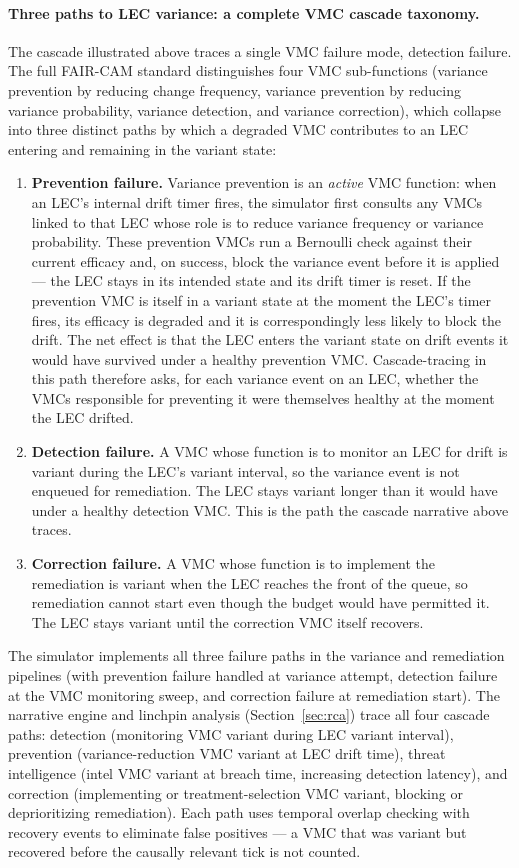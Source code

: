 \documentclass[11pt,a4paper]{article}
\begin{document}
\paragraph{Three paths to LEC variance: a complete VMC cascade taxonomy.}
The cascade illustrated above traces a single VMC failure mode, detection failure. The full FAIR-CAM standard distinguishes four VMC sub-functions (variance prevention by reducing change frequency, variance prevention by reducing variance probability, variance detection, and variance correction), which collapse into three distinct paths by which a degraded VMC contributes to an LEC entering and remaining in the variant state:
\begin{enumerate}[nosep]
    \item \textbf{Prevention failure.} Variance prevention is an \emph{active} VMC function: when an LEC's internal drift timer fires, the simulator first consults any VMCs linked to that LEC whose role is to reduce variance frequency or variance probability. These prevention VMCs run a Bernoulli check against their current efficacy and, on success, block the variance event before it is applied --- the LEC stays in its intended state and its drift timer is reset. If the prevention VMC is itself in a variant state at the moment the LEC's timer fires, its efficacy is degraded and it is correspondingly less likely to block the drift. The net effect is that the LEC enters the variant state on drift events it would have survived under a healthy prevention VMC. Cascade-tracing in this path therefore asks, for each variance event on an LEC, whether the VMCs responsible for preventing it were themselves healthy at the moment the LEC drifted.
    \item \textbf{Detection failure.} A VMC whose function is to monitor an LEC for drift is variant during the LEC's variant interval, so the variance event is not enqueued for remediation. The LEC stays variant longer than it would have under a healthy detection VMC. This is the path the cascade narrative above traces.
    \item \textbf{Correction failure.} A VMC whose function is to implement the remediation is variant when the LEC reaches the front of the queue, so remediation cannot start even though the budget would have permitted it. The LEC stays variant until the correction VMC itself recovers.
\end{enumerate}
The simulator implements all three failure paths in the variance and remediation pipelines (with prevention failure handled at variance attempt, detection failure at the VMC monitoring sweep, and correction failure at remediation start). The narrative engine and linchpin analysis (Section~\ref{sec:rca}) trace all four cascade paths: detection (monitoring VMC variant during LEC variant interval), prevention (variance-reduction VMC variant at LEC drift time), threat intelligence (intel VMC variant at breach time, increasing detection latency), and correction (implementing or treatment-selection VMC variant, blocking or deprioritizing remediation). Each path uses temporal overlap checking with recovery events to eliminate false positives --- a VMC that was variant but recovered before the causally relevant tick is not counted.
\end{document}
